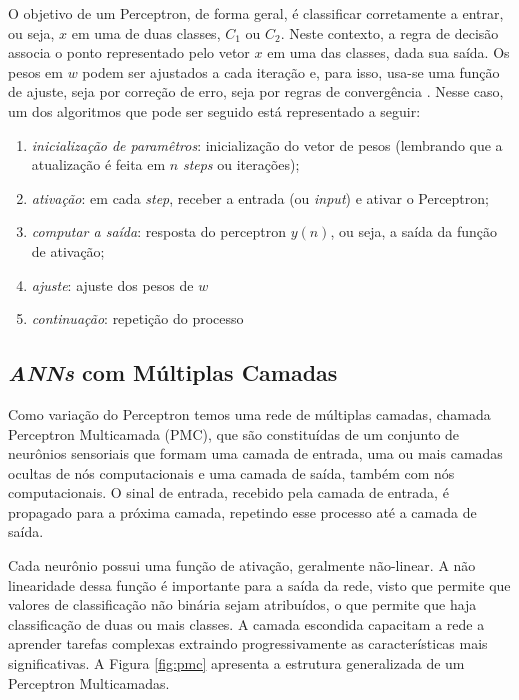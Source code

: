 O objetivo de um Perceptron, de forma geral, é classificar corretamente a entrar, ou seja, $x$ em uma de duas classes, $C_1$ ou $C_2$. Neste contexto, a regra de decisão associa o ponto representado pelo vetor $x$ em uma das classes, dada sua saída. Os pesos em $w$ podem ser ajustados a cada iteração e, para isso, usa-se uma função de ajuste, seja por correção de erro, seja por regras de convergência \cite{Haykin2nd-136}. Nesse caso, um dos algoritmos que pode ser seguido está representado a seguir:
\begin{enumerate}
	\item \textit{inicialização de paramêtros}: inicialização do vetor de pesos (lembrando que a atualização é feita em $n$ \textit{steps} ou iterações);
	\item \textit{ativação}: em cada \textit{step}, receber a entrada (ou \textit{input}) e ativar o Perceptron;
	\item \textit{computar a saída}: resposta do perceptron $y(n)$, ou seja, a saída da função de ativação;
	\item \textit{ajuste}: ajuste dos pesos de $w$ 
	\item \textit{continuação}: repetição do processo	 
\end{enumerate}

\subsection{\textit{ANNs} com Múltiplas Camadas}



Como variação do Perceptron temos uma rede de múltiplas camadas, chamada Perceptron Multicamada (PMC), que são constituídas de um conjunto de neurônios sensoriais que formam uma camada de entrada, uma ou mais camadas ocultas de nós computacionais e uma camada de saída, também com nós computacionais. O sinal de entrada, recebido pela camada de entrada, é propagado para a próxima camada, repetindo esse processo até a camada de saída\cite{Haykin98p93}. 

Cada neurônio possui uma função de ativação, geralmente não-linear. A não linearidade dessa função é importante para a saída da rede, visto que permite que valores de classificação não binária sejam atribuídos, o que permite que haja classificação de duas ou mais classes. A camada escondida capacitam a rede a aprender tarefas complexas extraindo progressivamente as características mais significativas. A Figura \ref{fig:pmc} apresenta a estrutura generalizada de um Perceptron Multicamadas. 

